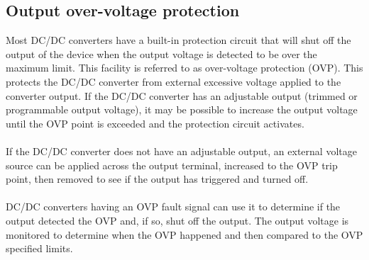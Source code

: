\subsection{Output over-voltage protection} 

Most DC/DC converters have a built-in protection circuit that will shut off the output of the device when the output voltage is detected to be over the maximum limit. This facility is referred to as over-voltage protection (OVP). This protects the DC/DC converter from external excessive voltage applied to the converter output. If the DC/DC converter has an adjustable output (trimmed or programmable output voltage), it may be possible to increase the output voltage until the OVP point is exceeded and the protection circuit activates.
\\ \\
If the DC/DC converter does not have an adjustable output, an external voltage source can be applied across the output terminal, increased to the OVP trip point, then removed to see if the output has triggered and turned off.
\\ \\
DC/DC converters having an OVP fault signal can use it to determine if the output detected the OVP and, if so, shut off the output. The output voltage is monitored to determine when the OVP happened and then compared to the OVP specified limits.
\\ \\

